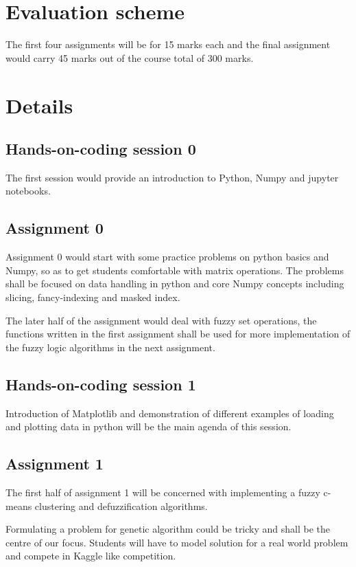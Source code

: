 \documentclass{article} %
\begin{document}
\section{Evaluation scheme}
The first four assignments will be for 15 marks each and the final assignment would 
carry 45 marks out of the course total of 300 marks.

\section{Details}

\subsection{Hands-on-coding session 0}

The first session would provide an introduction to Python, Numpy and jupyter notebooks.

\subsection{Assignment 0}

Assignment 0 would start with some practice problems on python basics and Numpy, so as to get students comfortable with matrix operations.
The problems shall be focused on data handling in python and core Numpy concepts
including slicing, fancy-indexing and masked index.

The later half of the assignment would deal with fuzzy set operations, the functions written in the first assignment shall be
used for more implementation of the fuzzy logic algorithms in the next assignment.

\subsection{Hands-on-coding session 1}

Introduction of Matplotlib and demonstration of different examples of loading and plotting data in python will be 
the main agenda of this session.

\subsection{Assignment 1}

The first half of assignment 1 will be concerned with implementing a fuzzy c-means clustering and defuzzification algorithms.

Formulating a problem for genetic algorithm could be tricky and shall be the centre of our focus.
Students will have to model solution for a real world problem and compete in Kaggle like competition. 
\end{document}
